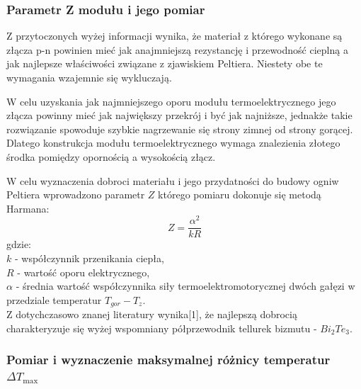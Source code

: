 \documentclass[oneside]{mgr}
\begin{document}
\subsubsection{Parametr Z modułu i jego pomiar}
Z przytoczonych wyżej informacji wynika, że materiał z którego wykonane są złącza p-n powinien mieć jak anajmniejszą rezystancję i przewodność cieplną a jak najlepsze właściwości związane z zjawiskiem Peltiera. Niestety obe te wymagania wzajemnie się wykluczają.

W celu uzyskania jak najmniejszego oporu modułu termoelektrycznego jego złącza powinny mieć jak największy przekrój i być jak najniższe, jednakże takie rozwiązanie spowoduje szybkie nagrzewanie się strony zimnej od strony gorącej. Dlatego konstrukcja modułu termoelektrycznego wymaga znalezienia złotego środka pomiędzy opornością a wysokością złącz.

W celu wyznaczenia dobroci materiału i jego przydatności do budowy ogniw Peltiera wprowadzono parametr $Z$ którego pomiaru dokonuje się metodą Harmana:
\begin{equation}
    Z = \frac{\alpha^2}{kR}
\end{equation}
gdzie: \\
$k$ - współczynnik przenikania ciepła, \\
$R$ - wartość oporu elektrycznego, \\
$\alpha$ - średnia wartość współczynnika siły termoelektromotorycznej dwóch gałęzi w przedziale temperatur $T_{gor}-T_z$. \\

Z dotychczasowo znanej literatury wynika[1], że najlepszą dobrocią charakteryzuje się wyżej wspomniany półprzewodnik tellurek bizmutu - $Bi_2 Te_3$.

\subsubsection{Pomiar i wyznaczenie maksymalnej różnicy temperatur $\Delta T_{\max}$}
\end{document}

